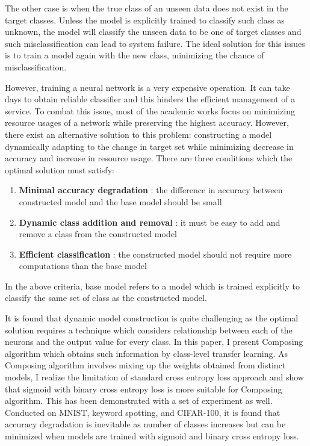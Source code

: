 \documentclass{article}
\begin{document}
The other case is when the true class of an unseen data does not exist in the target classes. Unless the model is explicitly trained to classify such class as unknown, the model will classify the unseen data to be one of target classes and such misclassification can lead to system failure. The ideal solution for this issues is to train a model again with the new class, minimizing the chance of misclassification.

However, training a neural network is a very expensive operation. It can take days to obtain reliable classifier and this hinders the efficient management of a service. To combat this issue, most of the academic works focus on minimizing resource usages of a network while preserving the highest accuracy. However, there exist an alternative solution to this problem: constructing a model dynamically adapting to the change in target set while minimizing decrease in accuracy and increase in resource usage. There are three conditions which the optimal solution must satisfy:

\begin{enumerate}
    \item \textbf{Minimal accuracy degradation} : the difference in accuracy between constructed model and the base model should be small
    \item \textbf{Dynamic class addition and removal} : it must be easy to add and remove a class from the constructed model
    \item \textbf{Efficient classification} : the constructed model should not require more computations than the base model
\end{enumerate}

In the above criteria, base model refers to a model which is trained explicitly to classify the same set of class as the constructed model.

It is found that dynamic model construction is quite challenging as the optimal solution requires a technique which considers relationship between each of the neurons and the output value for every class. In this paper, I present Composing algorithm which obtains such information by class-level transfer learning. As Composing algorithm involves mixing up the weights obtained from distinct models, I realize the limitation of standard cross entropy loss approach and show that sigmoid with binary cross entropy loss is more suitable for Composing algorithm. This has been demonstrated with a set of experiment as well. Conducted on MNIST, keyword spotting, and CIFAR-100, it is found that accuracy degradation is inevitable as number of classes increases but can be minimized when models are trained with sigmoid and binary cross entropy loss.
\end{document}
